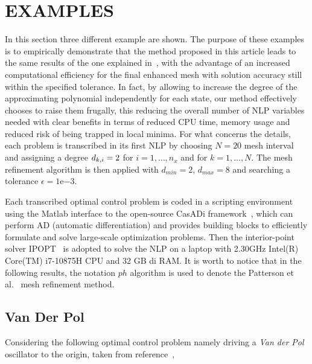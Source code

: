 \section*{EXAMPLES}
In this section three different example are shown. The purpose of these examples is to empirically demonstrate that the method proposed in this article leads to the same results of the one explained in~\cite{Patterson:OCAM:2015}, with the advantage of an increased computational efficiency for the final enhanced mesh with solution accuracy still within the specified tolerance. In fact, by allowing to increase the degree of the approximating polynomial independently for each state, our method effectively chooses to raise them frugally, this reducing the overall number of NLP variables needed with clear benefits in terms of reduced CPU time, memory usage and reduced risk of being trapped in local minima.
For what concerns the details, each problem is transcribed in its first NLP by choosing $N = 20$ mesh interval and assigning a degree $d_{k,i} = 2$ for $i = 1, \dots, n_x$ and for $k = 1, \dots, N$. The mesh refinement algorithm is then applied with $d_{min} = 2$, $d_{max} = 8$ and searching a tolerance $\epsilon = 1\mathrm{e}{-3}$.

Each transcribed optimal control problem is coded in a scripting environment using the
Matlab interface to the open-source CasADi framework~\cite{casadi:MPC:2019}, which can perform AD (automatic differentiation) and provides building blocks to efficiently formulate and solve large-scale optimization problems. Then the interior-point solver IPOPT~\cite{Biegler:CCE:2009} is adopted to solve the NLP on a laptop with 2.30GHz Intel(R) Core(TM) i7-10875H CPU and 32 GB di RAM.
It is worth to notice that in the following results, the notation $ph$ algorithm is used to denote the Patterson et al.~\cite{Patterson:OCAM:2015} mesh refinement method.


\subsection*{Van Der Pol}
Considering the following optimal control problem namely
driving a \emph{Van der Pol} oscillator to the origin, taken from reference~\cite{casadi:DOC:2018},

